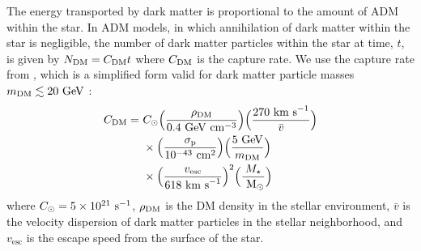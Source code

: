 \documentclass[useAMS,usenatbib]{mnras}
\begin{document}
  The energy transported by dark matter is proportional to the amount of ADM within the star.
  In ADM models, in which annihilation of dark matter within the star is negligible, the number
  of dark matter particles within the star at time, $t$, is given by $N_{\mathrm{DM}} = C_{\mathrm{DM}} t$
  where $C_{\mathrm{DM}}$ is the capture rate. We use the capture rate from \citet{Zentner2011AsymmetricDwarfs},
  which is a simplified form valid for dark matter particle masses
  $m_{\mathrm{DM}} \lesssim 20 \ \mathrm{GeV}$ \citep[see][ for more complete capture rates]{Gould1992CosmologicalAnnihilations,Zentner2009High-energySun}:
  \begin{align}
  \begin{split}
    \label{eq:capturerate}
    C_{\mathrm{DM}} =\ & C_{\odot}
    \Big(\frac{\rho_{\mathrm{DM}}}{0.4 \ \mathrm{GeV} \ \mathrm{cm}^{-3}}\Big)
    \Big(\frac{270 \ \mathrm{km\ s}^{-1}}{\bar{v}}\Big) \\
    & \times \Big(\frac{\sigma_{\mathrm{p}}}{10^{-43} \ \mathrm{cm}^2}\Big) \Big(\frac{5 \ \mathrm{GeV}}{m_{\mathrm{DM}}}\Big) \\
    & \times \Big(\frac{v_{\mathrm{esc}}}{618 \ \mathrm{km\ s}^{-1}}\Big)^2
    \Big(\frac{M_{\star}}{\ \mathrm{M}_{\odot}}\Big)
  \end{split}
  \end{align}
  where $C_{\odot} = 5 \times 10^{21} \ \mathrm{s}^{-1}$,
  $\rho_{\mathrm{DM}}$ is the DM density in the stellar environment,
  $\bar{v}$ is the velocity dispersion of dark matter particles
  in the stellar neighborhood, and $v_{\mathrm{esc}}$ is the escape speed from the
  surface of the star.
\end{document}
